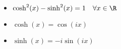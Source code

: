 \begin{itemize}
    \item $\cosh^2(x) - \sinh^2(x) = 1 \quad \forall x \in \R$
    \item $\cosh(x) = \cos(ix)$
    \item $\sinh(x) = -i \sin(ix)$
\end{itemize}
